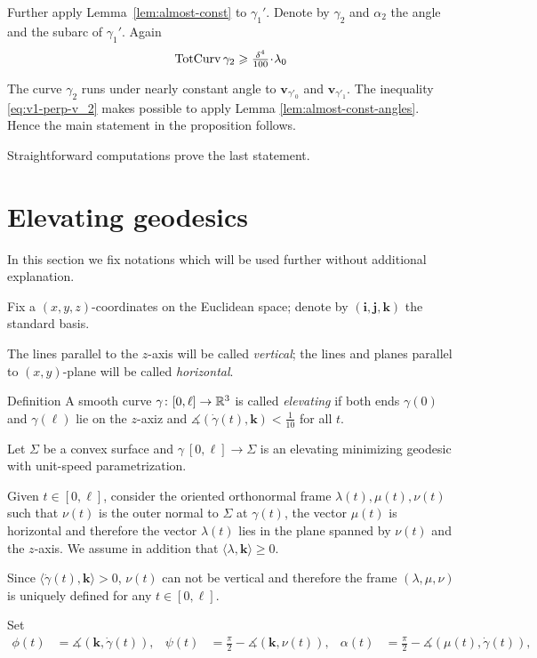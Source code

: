 \documentclass[a4paper,10pt]{amsart}
\begin{document}
Further apply Lemma~\ref{lem:almost-const} to $\gamma_1'$.
Denote by $\gamma_2$ and $\alpha_2$ the angle and the subarc of $\gamma_1'$.
Again
\[\tc\gamma_2\ge\tfrac{\delta^4}{100}\cdot\lambda_0\]


The curve $\gamma_2$ runs under nearly constant angle to  $\bm{v}_{\gamma'_0}$ and $\bm{v}_{\gamma'_1}$.
The inequality \ref{eq:v1-perp-v_2}
makes possible to apply Lemma \ref{lem:almost-const-angles}.
Hence the main statement in the proposition follows.

Straightforward computations prove the last statement.
\qeds



\section{Elevating geodesics}\label{sec:elevating}

In this section we fix notations which will be used further 
without additional explanation.

Fix a $(x,y,z)$-coordinates on the Euclidean space;
denote by $(\bm{i},\bm{j},\bm{k})$
the standard basis.

The lines parallel to the $z$-axis will be called \emph{vertical};
the lines and planes parallel to $(x,y)$-plane will be called \emph{horizontal}.

\begin{thm}{Definition}
A smooth curve $\gamma\colon[0,\ell]\to\mathbb{R}^3$ 
is called \emph{elevating} if both ends $\gamma(0)$ and $\gamma(\ell)$ lie on the $z$-axiz and 
$\measuredangle(\dot\gamma(t),\bm{k})<\tfrac1{10}$ for all $t$.
\end{thm}

Let $\Sigma$ be a convex surface 
and $\gamma\:[0,\ell]\to \Sigma$ is an elevating minimizing geodesic 
with unit-speed parametrization.

Given $t\in [0,\ell]$, 
consider the oriented orthonormal frame $\lambda(t),\mu(t),\nu(t)$ 
such that $\nu(t)$ is the outer normal to $\Sigma$ at $\gamma(t)$,
the vector $\mu(t)$ is horizontal and therefore the vector $\lambda(t)$ lies in the plane spanned by $\nu(t)$ and the $z$-axis.
We assume in addition that $\langle\lambda,\bm{k}\rangle\ge 0$.

Since $\langle\dot\gamma(t),\bm{k}\rangle>0$, 
$\nu(t)$ can not be vertical 
and therefore the frame $(\lambda,\mu,\nu)$ is uniquely defined for any $t\in[0,\ell]$.

Set 
\begin{align*}
\phi(t)&=\measuredangle(\bm{k},\dot\gamma(t)),&
\psi(t)&=\tfrac\pi2-\measuredangle(\bm{k},\nu(t)),&
\alpha(t)&=\tfrac\pi2-\measuredangle(\mu(t),\dot\gamma(t)),
\end{align*}
\end{document}
